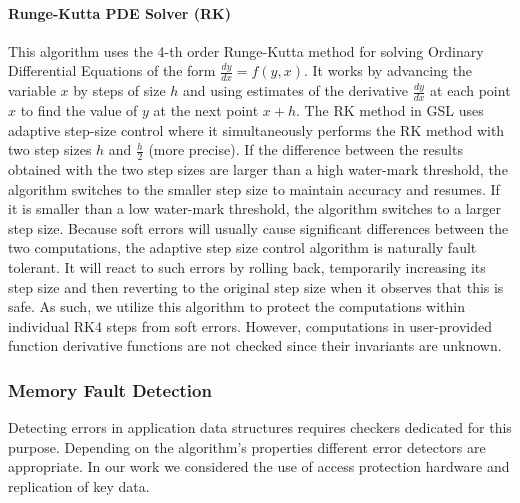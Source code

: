 \documentclass{sig-alternate}
\begin{document}
\paragraph{Runge-Kutta PDE Solver (RK)}
This algorithm uses the 4-th order Runge-Kutta method for solving Ordinary Differential Equations of the form $\frac{dy}{dx} = f(y, x)$.
It works by advancing the variable $x$ by steps of size $h$ and using estimates of the derivative $\frac{dy}{dx}$ at each point $x$ to find the value of $y$ at the next point $x+h$.
The RK method in GSL uses adaptive step-size control where it simultaneously performs the RK method with two step sizes $h$ and $\frac{h}{2}$ (more precise).
If the difference between the results obtained with the two step sizes are larger than a high water-mark threshold, the algorithm switches to the smaller step size to maintain accuracy and resumes.
If it is smaller than a low water-mark threshold, the algorithm switches to a larger step size.
Because soft errors will usually cause significant differences between the two computations, the adaptive step size control algorithm is naturally fault tolerant.
It will react to such errors by rolling back, temporarily increasing its step size and then reverting to the original step size when it observes that this is safe.
As such, we utilize this algorithm to protect the computations within individual RK4 steps from soft errors.
However, computations in user-provided function derivative functions are not checked since their invariants are unknown.

\subsubsection{Memory Fault Detection}
\label{sec:res_tech:err_det:mem}

Detecting errors in application data structures requires checkers dedicated for this purpose.
Depending on the algorithm's properties different error detectors are appropriate.
In our work we considered the use of access protection hardware and replication of key data.
\end{document}
